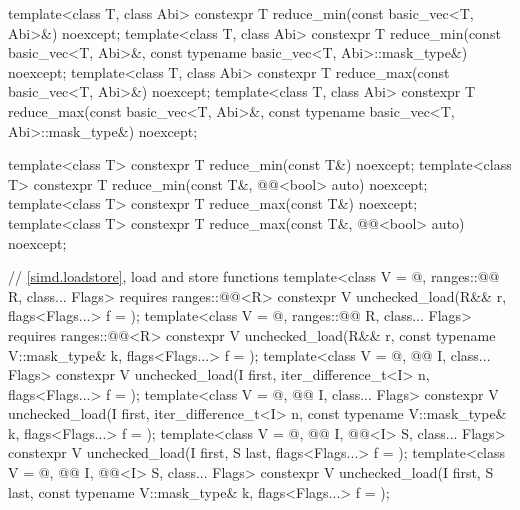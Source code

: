 \begin{codeblock}
{  template<class T, class Abi>
    constexpr T reduce_min(const basic_vec<T, Abi>&) noexcept;
  template<class T, class Abi>
    constexpr T reduce_min(const basic_vec<T, Abi>&,
                           const typename basic_vec<T, Abi>::mask_type&) noexcept;
  template<class T, class Abi>
    constexpr T reduce_max(const basic_vec<T, Abi>&) noexcept;
  template<class T, class Abi>
    constexpr T reduce_max(const basic_vec<T, Abi>&,
                           const typename basic_vec<T, Abi>::mask_type&) noexcept;

  template<class T> constexpr T reduce_min(const T&) noexcept;
  template<class T> constexpr T reduce_min(const T&, @@<bool> auto) noexcept;
  template<class T> constexpr T reduce_max(const T&) noexcept;
  template<class T> constexpr T reduce_max(const T&, @@<bool> auto) noexcept;

  // \ref{simd.loadstore}, load and store functions
  template<class V = @\seebelow@, ranges::@@ R, class... Flags>
    requires ranges::@@<R>
    constexpr V unchecked_load(R&& r, flags<Flags...> f = {});
  template<class V = @\seebelow@, ranges::@@ R, class... Flags>
    requires ranges::@@<R>
    constexpr V unchecked_load(R&& r, const typename V::mask_type& k,
                               flags<Flags...> f = {});
  template<class V = @\seebelow@, @@ I, class... Flags>
    constexpr V unchecked_load(I first, iter_difference_t<I> n,
                               flags<Flags...> f = {});
  template<class V = @\seebelow@, @@ I, class... Flags>
    constexpr V unchecked_load(I first, iter_difference_t<I> n,
                               const typename V::mask_type& k, flags<Flags...> f = {});
  template<class V = @\seebelow@, @@ I, @@<I> S, class... Flags>
    constexpr V unchecked_load(I first, S last, flags<Flags...> f = {});
  template<class V = @\seebelow@, @@ I, @@<I> S, class... Flags>
    constexpr V unchecked_load(I first, S last, const typename V::mask_type& k,
                               flags<Flags...> f = {});

}
\end{codeblock}
